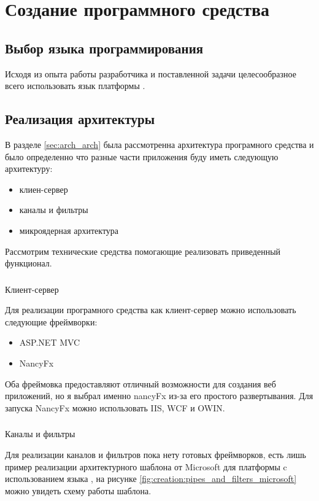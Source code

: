 \section{Создание программного средства}
\label{sec:creation}

\subsection{Выбор языка программирования}
Исходя из опыта работы разработчика и поставленной задачи целесообразное всего использовать язык \csharp{} платформы \dotnet{}.


\subsection{Реализация архитектуры}
В разделе \ref{sec:arch_arch} была рассмотренна архитектура програмного средства и было определенно что разные части приложения буду иметь следующую архитектуру:
\begin{itemize}
	\item клиен-сервер
	\item каналы и фильтры
	\item микроядерная архитектура
\end{itemize}
Рассмотрим технические средства помогающие реализовать приведенный функционал.

\subsubsection{}
Клиент-сервер

Для реализации програмного средства как клиент-сервер можно использовать следующие фреймворки:
\begin{itemize}
	\item ASP.NET MVC
	\item NancyFx
\end{itemize}
Оба фреймовка предоставляют отличный возможности для создания веб приложений, но я выбрал именно nancyFx из-за его простого развертывания. Для запуска NancyFx можно использовать IIS, WCF и OWIN.


\subsubsection{}
Каналы и фильтры

Для реализации каналов и фильтров пока нету готовых фреймворков, есть лишь пример реализации архитектурного шаблона от Microsoft для платформы c использованием языка \csharp{} \cite{pipes_and_filters_pattern}, на рисунке \ref{fig:creation:pipes_and_filters_microsoft} можно увидеть схему работы шаблона.

